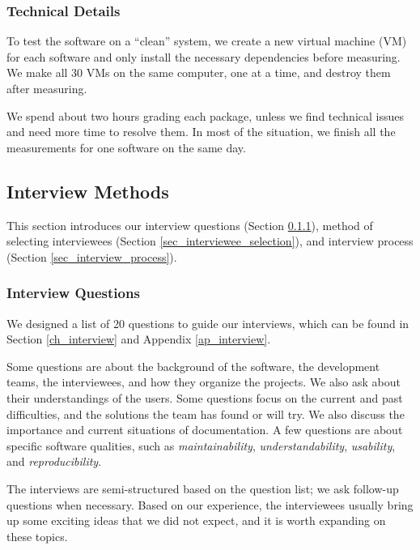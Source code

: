 \documentclass[3p, 12pt,authoryear]{elsarticle}
\begin{document}
\subsubsection{Technical Details} \label{sec_technical_details}

To test the software on a ``clean'' system, we create a new virtual machine (VM)
for each software and only install the necessary dependencies before measuring.
We make all 30 VMs on the same computer, one at a time, and destroy them after
measuring.

We spend about two hours grading each package, unless we find technical issues
and need more time to resolve them. In most of the situation, we finish all the
measurements for one software on the same day.

\subsection{Interview Methods} \label{sec_interview_methods}

This section introduces our interview questions (Section
\ref{sec_interview_questions}), method of selecting interviewees (Section
\ref{sec_interviewee_selection}), and interview process (Section
\ref{sec_interview_process}).

\subsubsection{Interview Questions} \label{sec_interview_questions}

We designed a list of 20 questions to guide our interviews, which can be found
in Section \ref{ch_interview} and Appendix \ref{ap_interview}.

Some questions are about the background of the software, the development teams,
the interviewees, and how they organize the projects. We also ask about their
understandings of the users. Some questions focus on the current and past
difficulties, and the solutions the team has found or will try. We also discuss
the importance and current situations of documentation. A few questions are
about specific software qualities, such as \textit{maintainability},
\textit{understandability}, \textit{usability}, and \textit{reproducibility}.

The interviews are semi-structured based on the question list; we ask follow-up
questions when necessary. Based on our experience, the interviewees usually
bring up some exciting ideas that we did not expect, and it is worth expanding
on these topics.
\end{document}
